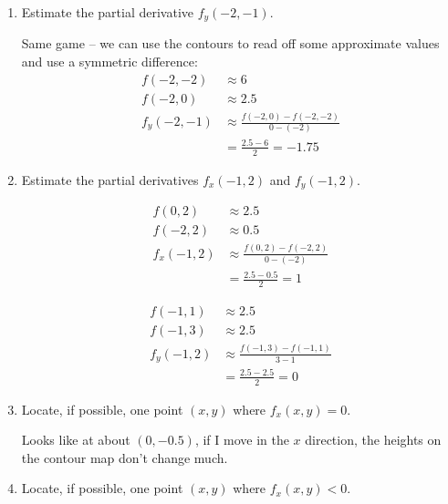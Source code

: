 \begin{enumerate}[leftmargin=0pt]
\begin{enumerate}
    \item Estimate the partial derivative $f_y(-2, -1).$
    
    \begin{red}
    Same game -- we can use the contours to read off some approximate values and use a symmetric difference: 
    \begin{align*}
        f(-2, -2) &\approx 6 \\
        f(-2, 0) &\approx 2.5 \\
        f_y(-2,-1) &\approx 
        \frac{f(-2, 0) - f(-2, -2)}{0-(-2)} \\
        &= \frac{2.5-6}{2} = -1.75
    \end{align*}
    \end{red}
    
    \item Estimate the partial derivatives $f_x(-1, 2)$ and $f_y(-1, 2)$.
    \begin{red}
    \begin{multicols}{2}
    \begin{align*}
        f(0, 2) &\approx 2.5\\
        f(-2, 2) &\approx 0.5 \\
        f_x(-1,2) &\approx 
        \frac{f(0,2)-f(-2,2)}{0-(-2)} \\
        &= \frac{2.5-0.5}{2} = 1
    \end{align*}
    
    \begin{align*}
        f(-1,1) &\approx 2.5 \\
        f(-1,3) &\approx 2.5 \\
        f_y(-1,2) &\approx
        \frac{f(-1,3)-f(-1,1)}{3-1} \\
        &= \frac{2.5-2.5}{2} = 0
    \end{align*}
    \end{multicols}
    \end{red}
    
    \item Locate, if possible, one point $(x,y)$ where $f_x(x,y)=0$.
    
    \begin{red}
    Looks like at about $(0, -0.5)$, if I move in the $x$ direction, the heights on the contour map don't change much.
    \end{red}
    
    \item Locate, if possible, one point $(x,y)$ where $f_x(x,y)<0$.
    

\end{enumerate}
\end{enumerate}

